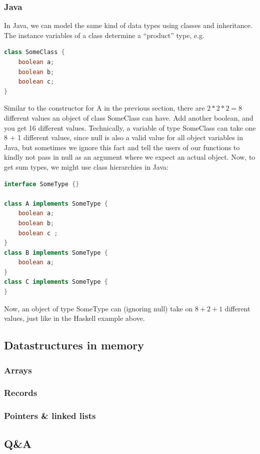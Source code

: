 \documentclass{article}
\begin{document}
            \subsubsection*{Java}
            In Java, we can model the same kind of data types using classes and inheritance. The instance
            variables of a class determine a “product” type, e.g.
            \begin{lstlisting}[language=Java]
class SomeClass {
    boolean a;
    boolean b;
    boolean c;
}
            \end{lstlisting}
        Similar to the constructor for A in the previous section, there are $2 * 2 * 2 = 8$ different
values an object of class SomeClass can have. Add another boolean, and you get 16 different
values. Technically, a variable of type SomeClass can take one 8 + 1 different values, since
null is also a valid value for all object variables in Java, but sometimes we ignore this fact
and tell the users of our functions to kindly not pass in null as an argument where we expect
an actual object.
Now, to get sum types, we might use class hierarchies in Java:

\begin{lstlisting}[language=Java]
interface SomeType {}

class A implements SomeType {
    boolean a;
    boolean b;
    boolean c ;
}
class B implements SomeType {
    boolean a;
}
class C implements SomeType {
}

\end{lstlisting}
    Now, an object of type SomeType can (ignoring null) take on $8 + 2 + 1$ different values,
    just like in the Haskell example above.
        
        \subsection{Datastructures in memory}
        \subsubsection{Arrays}
        \subsubsection{Records}
        \subsubsection{Pointers \& linked lists}
        \subsection{Q\&A}
\end{document}
